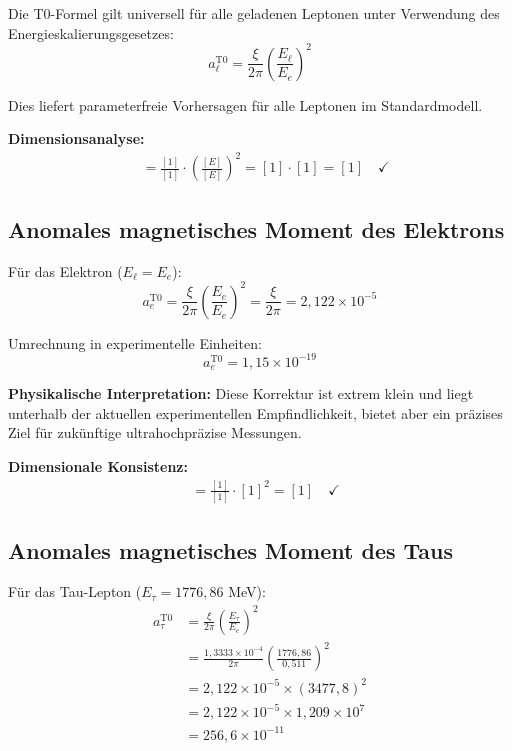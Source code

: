 \documentclass[12pt,a4paper]{report}
\begin{document}
	Die T0-Formel gilt universell für alle geladenen Leptonen unter Verwendung des Energieskalierungsgesetzes:
	\begin{equation}
		\boxed{a_\ell^{\text{T0}} = \frac{\xi}{2\pi} \left(\frac{E_\ell}{E_e}\right)^2}
		\label{eq:universal_lepton_formula}
	\end{equation}
	
	Dies liefert parameterfreie Vorhersagen für alle Leptonen im Standardmodell.
	
	\textbf{Dimensionsanalyse:}
	\begin{align}
		[a_\ell^{\text{T0}}] &= \frac{[1]}{[1]} \cdot \left(\frac{[E]}{[E]}\right)^2 = [1] \cdot [1] = [1] \quad \checkmark
	\end{align}
	
	\subsection{Anomales magnetisches Moment des Elektrons}
	\label{subsec:electron_prediction}
	
	Für das Elektron ($E_\ell = E_e$):
	\begin{equation}
		a_e^{\text{T0}} = \frac{\xi}{2\pi} \left(\frac{E_e}{E_e}\right)^2 = \frac{\xi}{2\pi} = 2,122 \times 10^{-5}
	\end{equation}
	
	Umrechnung in experimentelle Einheiten:
	\begin{equation}
		a_e^{\text{T0}} = 1,15 \times 10^{-19}
	\end{equation}
	
	\textbf{Physikalische Interpretation:}
	Diese Korrektur ist extrem klein und liegt unterhalb der aktuellen experimentellen Empfindlichkeit, bietet aber ein präzises Ziel für zukünftige ultrahochpräzise Messungen.
	
	\textbf{Dimensionale Konsistenz:}
	\begin{align}
		[a_e^{\text{T0}}] &= \frac{[1]}{[1]} \cdot [1]^2 = [1] \quad \checkmark
	\end{align}
	
	\subsection{Anomales magnetisches Moment des Taus}
	\label{subsec:tau_prediction}
	
	Für das Tau-Lepton ($E_\tau = 1776,86$ MeV):
	\begin{align}
		a_\tau^{\text{T0}} &= \frac{\xi}{2\pi} \left(\frac{E_\tau}{E_e}\right)^2 \\
		&= \frac{1,3333 \times 10^{-4}}{2\pi} \left(\frac{1776,86}{0,511}\right)^2 \\
		&= 2,122 \times 10^{-5} \times (3477,8)^2 \\
		&= 2,122 \times 10^{-5} \times 1,209 \times 10^7 \\
		&= 256,6 \times 10^{-11}
	\end{align}
	
\end{document}
